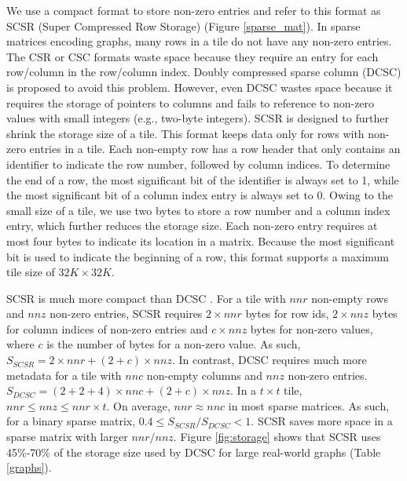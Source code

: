 We use a compact format to store non-zero entries and refer to this
format as SCSR (Super Compressed Row Storage) (Figure \ref{sparse_mat}).
In sparse matrices encoding graphs, many rows in a tile
do not have any non-zero entries. The CSR or CSC formats waste space because
they require an entry for each row/column in the row/column index. Doubly
compressed sparse column (DCSC) \cite{Buluc08} is proposed to avoid this problem.
However, even DCSC wastes space because it requires the storage of
pointers to columns and fails to reference to non-zero values with small
integers (e.g., two-byte integers). SCSR is designed to further shrink the storage
size of a tile. This format keeps data only for rows with non-zero entries in
a tile. Each non-empty row has a row header that only contains an identifier
to indicate the row number, followed by column indices. To determine the end
of a row, the most significant bit of the identifier is always set to 1, while
the most significant bit of a column index entry is always set to 0.
Owing to the small size of a tile, we use two bytes to store a row
number and a column index entry, which further reduces the storage size.
Each non-zero entry requires at most four bytes to indicate its location in
a matrix. Because the most significant bit is used to indicate the beginning
of a row, this format supports a maximum tile size of $32K \times 32K$.

SCSR is much more compact than DCSC \cite{Buluc08}. For a tile with $nnr$
non-empty rows and $nnz$ non-zero entries,
SCSR requires $2 \times nnr$ bytes for row ids, $2 \times nnz$ bytes for column
indices of non-zero entries and $c \times nnz$ bytes for non-zero values, where
$c$ is the number of
bytes for a non-zero value. As such, $S_{SCSR} = 2 \times nnr + (2 + c) \times nnz$.
In contrast, DCSC requires much more metadata for a tile
with $nnc$ non-empty columns and $nnz$ non-zero entries.
$S_{DCSC} = (2 + 2 + 4) \times nnc + (2 + c) \times nnz$. In a $t \times t$
tile, $nnr \le nnz \le nnr \times t$. On average, $nnr \approx nnc$ in most sparse
matrices. As such, for a binary sparse matrix, $0.4 \le S_{SCSR} / S_{DCSC} < 1$.
SCSR saves more space in a sparse matrix with larger $nnr / nnz$. Figure
\ref{fig:storage} shows that SCSR uses 45\%-70\% of the storage size used by DCSC
for large real-world graphs (Table \ref{graphs}).

